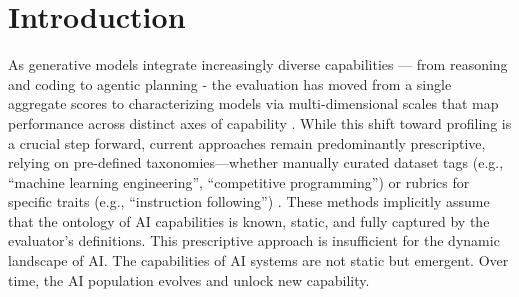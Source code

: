 \documentclass{article}
\theoremstyle{plain}
\theoremstyle{definition}
\theoremstyle{remark}
\begin{document}
\section{Introduction}





As generative models integrate increasingly diverse capabilities — from reasoning and coding to agentic planning - the evaluation has moved from a single aggregate scores to characterizing models via multi-dimensional scales that map performance across distinct axes of capability \cite{liang2022holistic, zhou2025general}. While this shift toward profiling is a crucial step forward, current approaches remain predominantly prescriptive, relying on pre-defined taxonomies—whether manually curated dataset tags (e.g., ``machine learning engineering'', ``competitive programming'') or rubrics for specific traits (e.g., ``instruction following'') \cite{zhou2025general}. These methods implicitly assume that the ontology of AI capabilities is known, static, and fully captured by the evaluator's definitions. This prescriptive approach is insufficient for the dynamic landscape of AI. The capabilities of AI systems are not static but emergent. Over time, the AI population evolves and unlock new capability.
\end{document}
